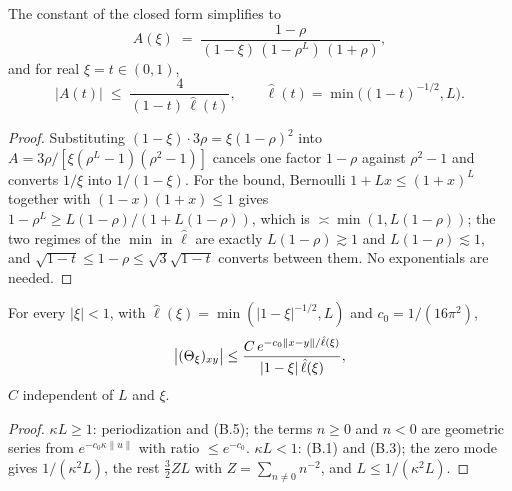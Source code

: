 \begin{lemma}\label{lem:prefactor}
  \leanok{}
  The constant of the closed form simplifies to
  \[ A(\xi) \;=\; \frac{1-\rho}{(1-\xi)\,(1-\rho^L)\,(1+\rho)} , \]
  and for real $\xi = t \in (0,1)$,
  \[ |A(t)| \;\le\; \frac{4}{(1-t)\,\hat\ell(t)},
     \qquad \hat\ell(t) = \min\bigl((1-t)^{-1/2}, L\bigr). \]
\end{lemma}
\begin{proof}\leanok{}
  Substituting $(1-\xi)\cdot 3\rho = \xi(1-\rho)^2$ into
  $A = 3\rho/[\xi(\rho^L-1)(\rho^2-1)]$ cancels one factor $1-\rho$ against
  $\rho^2-1$ and converts $1/\xi$ into $1/(1-\xi)$.  For the bound, Bernoulli
  $1+Lx \le (1+x)^L$ together with $(1-x)(1+x)\le 1$ gives
  $1-\rho^L \ge L(1-\rho)/(1+L(1-\rho))$, which is $\asymp \min(1, L(1-\rho))$;
  the two regimes of the $\min$ in $\hat\ell$ are exactly $L(1-\rho)\gtrsim 1$ and
  $L(1-\rho)\lesssim 1$, and $\sqrt{1-t}\le 1-\rho\le\sqrt 3\sqrt{1-t}$ converts
  between them.  No exponentials are needed.
\end{proof}

\begin{lemma}\label{lem:Theta-decay-complex}
  \leanok
  For every $|\xi|<1$, with $\hat\ell(\xi)=\min(|1-\xi|^{-1/2},L)$ and $c_0=1/(16\pi^2)$,
  \[ \bigl|(\Theta_\xi)_{xy}\bigr|\le\frac{C\,e^{-c_0\|x-y\|/\hat\ell(\xi)}}{|1-\xi|\,\hat\ell(\xi)} ,\]
  $C$ independent of $L$ and $\xi$.
\end{lemma}
\begin{proof}\leanok{}
  $\kappa L\ge1$: periodization and (B.5); the terms $n\ge0$ and $n<0$ are geometric series
  from $e^{-c_0\kappa\|u\|}$ with ratio $\le e^{-c_0}$.  $\kappa L<1$: (B.1) and (B.3); the zero
  mode gives $1/(\kappa^2L)$, the rest $\frac32 ZL$ with $Z=\sum_{n\neq0}n^{-2}$, and
  $L\le1/(\kappa^2L)$.
\end{proof}

